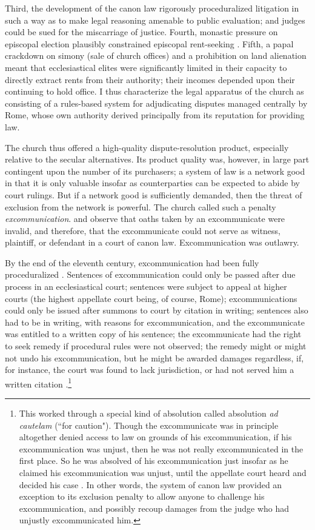 \documentclass[12pt]{article}
\theoremstyle{definition}
\theoremstyle{remark}
\begin{document}
Third, the development of the canon law rigorously proceduralized litigation in such a way as to make legal reasoning amenable to public evaluation; and judges could be sued for the miscarriage of justice. Fourth, monastic pressure on episcopal election plausibly constrained episcopal rent-seeking \citep{shera_2025}. Fifth, a papal crackdown on simony (sale of church offices) and a prohibition on land alienation meant that ecclesiastical elites were significantly limited in their capacity to directly extract rents from their authority; their incomes depended upon their continuing to hold office. I thus characterize the legal apparatus of the church as consisting of a rules-based system for adjudicating disputes managed centrally by Rome, whose own authority derived principally from its reputation for providing law.

The church thus offered a high-quality dispute-resolution product, especially relative to the secular alternatives. Its product quality was, however, in large part contingent upon the number of its purchasers; a system of law is a network good in that it is only valuable insofar as counterparties can be expected to abide by court rulings. But if a network good is sufficiently demanded, then the threat of exclusion from the network is powerful. The church called such a penalty \textit{excommunication}. \citet{vodola_1986} and \citet{helmholz_1982} observe that oaths taken by an excommunicate were invalid, and therefore, that the excommunicate could not serve as witness, plaintiff, or defendant in a court of canon law. Excommunication was outlawry.

By the end of the eleventh century, excommunication had been fully proceduralized 
\citep{helmholz_1982}. Sentences of excommunication could only be passed after due process in an ecclesiastical court; sentences were subject to appeal at higher courts (the highest appellate court being, of course, Rome); excommunications could only be issued after summons to court by citation in writing; sentences also had to be in writing, with reasons for excommunication, and the excommunicate was entitled to a written copy of his sentence; the excommunicate had the right to seek remedy if procedural rules were not observed; the remedy might or might not undo his excommunication, but he might be awarded damages regardless, if, for instance, the court was found to lack jurisdiction, or had not served him a written citation \citep[204--205]{helmholz_1982}.\footnote{This worked through a special kind of absolution called absolution \textit{ad cautelam} (``for caution"). Though the excommunicate was in principle altogether denied access to law on grounds of his excommunication, if his excommunication was unjust, then he was not really excommunicated in the first place. So he was absolved of his excommunication just insofar as he claimed his excommunication was unjust, until the appellate court heard and decided his case \citep[206]{helmholz_1982}. In other words, the system of canon law provided an exception to its exclusion penalty to allow anyone to challenge his excommunication, and possibly recoup damages from the judge who had unjustly excommunicated him.}
\end{document}
